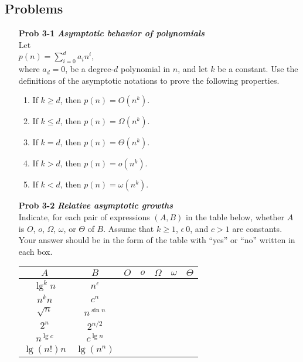 \documentclass[fontsize=12pt,paper=a4]{book}
\begin{document}
\subsection*{Problems}
\begin{enumerate}
	\item[\textbf{Prob 3-1}]
		\textbf{\textit{Asymptotic behavior of polynomials}}\\
		Let \\
		$p(n) = \sum_{i=0}^{d} a_in^i$,\\
		where $a_d=0$, be a degree-$d$ polynomial in $n$, and let $k$ be a constant. Use the definitions of the asymptotic notations to prove the following properties.
		\begin{enumerate}
			\item If $k \geq d$, then $p(n) = O(n^k)$.
			\item If $k \leq d$, then $p(n) = \Omega(n^k)$.
			\item If $k = d$, then $p(n) = \Theta(n^k)$.
			\item If $k > d$, then $p(n) = o(n^k)$.
			\item If $k < d$, then $p(n) = \omega(n^k)$.
		\end{enumerate}
		
	
	\item[\textbf{Prob 3-2}]
		\textbf{\textit{Relative asymptotic growths}}\\
		Indicate, for each pair of expressions $(A, B)$ in the table below, whether $A$ is $O$, $o$, $\Omega$, $\omega$, or $\Theta$ of $B$. Assume that $k \geq 1$, $\epsilon \> 0$, and $c>1$ are constants. Your answer should be in the form of the table with “yes” or “no” written in each box.
		\begin{tabular}{c c | p{2em} | p{2em} | p{2em} | p{2em} | p{2em} |}
			$A$ & $B$ & $O$ & $o$ & $\Omega$ & $\omega$ & $\Theta$ \\
			\hline
			$\lg^k n$ & $n^\epsilon$ & & & & & \\	
			\hline
			$n^k n$ & $c^n$ & & & & & \\	
			\hline
			$\sqrt{n}$ & $n^{\sin n}$ & & & & & \\	
			\hline
			$2^n$ & $2^{n/2}$ & & & & & \\	
			\hline
			$n^{\lg c}$ & $c^{\lg n}$ & & & & & \\	
			\hline
			$\lg(n!) n$ & $\lg(n^n)$ & & & & & \\	
			\hline			
		\end{tabular}
		

\end{enumerate}
\end{document}
